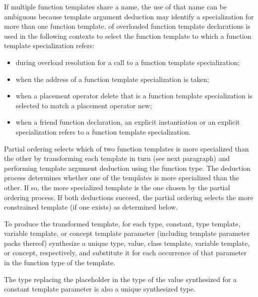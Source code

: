 \pnum
{}%
%
If multiple function templates share a name,
the use of that name can be ambiguous because
template argument deduction may identify
a specialization for more than one function template.
of overloaded function template declarations is used in the following contexts
to select the function template to which a function template specialization
refers:
\begin{itemize}
\item
during overload resolution for a call to a function template specialization;
\item
when the address of a function template specialization is taken;
\item
when a placement operator delete that is a
function template
specialization
is selected to match a placement operator new;
\item
when a friend function declaration, an
explicit instantiation or an explicit specialization refers to
a function template specialization.
\end{itemize}

\pnum
Partial ordering selects which of two function templates is more
specialized than the other by transforming each template in turn
(see next paragraph) and performing template argument deduction
using the function type.
The deduction process determines whether
one of the templates is more specialized than the other. If so, the
more specialized template is the one chosen by the partial ordering
process.
If both deductions succeed, the partial ordering selects
the more constrained template (if one exists) as determined below.

\pnum
To produce the transformed template, for each
type, constant,
type template, variable template, or concept
template parameter (including template parameter packs
thereof) synthesize a unique type, value, class template,
variable template, or concept,
respectively, and substitute it for each occurrence of that parameter
in the function type of the template.
\begin{note}
The type replacing the placeholder
in the type of the value synthesized for a constant template parameter
is also a unique synthesized type.
\end{note}

